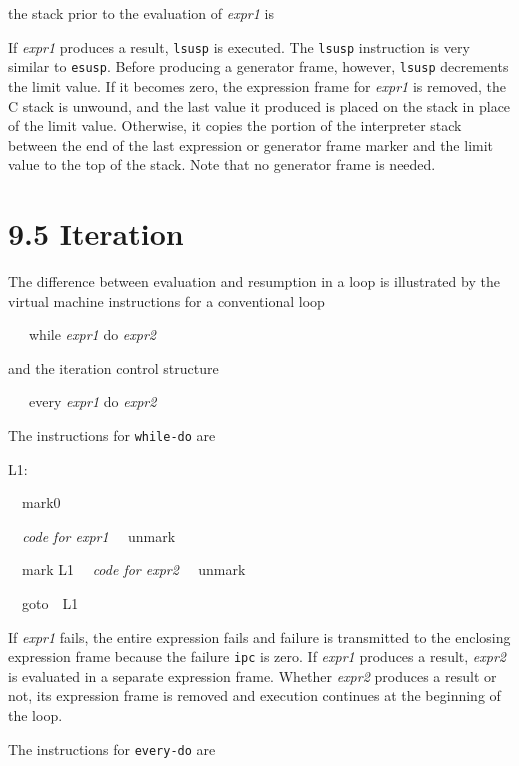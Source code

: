 \noindent the stack prior to the evaluation of \textit{expr1} is

\bigskip

If \textit{expr1} produces a result, \texttt{lsusp} is executed. The
\texttt{lsusp} instruction is very similar to \texttt{esusp}. Before
producing a generator frame, however, \texttt{lsusp} decrements the
limit value. If it becomes zero, the expression frame for
\textit{expr1} is removed, the C stack is unwound, and the last value
it produced is placed on the stack in place of the limit
value. Otherwise, it copies the portion of the interpreter stack
between the end of the last expression or generator frame marker and
the limit value to the top of the stack. Note that no generator frame
is needed.

\section[9.5 Iteration]{9.5 Iteration}

The difference between evaluation and resumption in a loop is
illustrated by the virtual machine instructions for a conventional
loop

{\ttfamily\mdseries
\ \ \ while \textit{expr1 }do \textit{expr2}}

and the iteration control structure

{\ttfamily\mdseries
\ \ \ every \textit{expr1 }do \textit{expr2}}

The instructions for \texttt{while-do} are

{\ttfamily
L1:}

{\ttfamily
\ \ mark0}

{\ttfamily
\textit{\ \ code for expr1\newline
\ \ }unmark}

{\ttfamily
\ \ mark L1\newline
\ \ \textit{code for expr2\newline
\ \ }unmark}

{\ttfamily
\ \ goto\ \ L1}

If \textit{expr1} fails, the entire expression fails and failure is
transmitted to the enclosing expression frame because the failure
\texttt{ipc} is zero. If \textit{expr1} produces a result,
\textit{expr2} is evaluated in a separate expression frame. Whether
\textit{expr2} produces a result or not, its expression frame is
removed and execution continues at the beginning of the loop.

The instructions for \texttt{every-do} are

